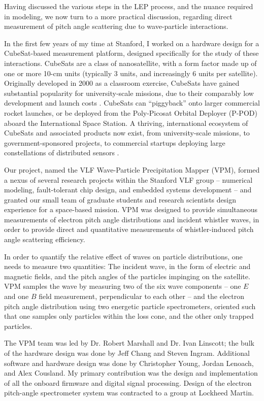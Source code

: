 Having discussed the various steps in the LEP process, and the nuance required in modeling, we now turn to a more practical discussion, regarding direct measurement of pitch angle scattering due to wave-particle interactions. 

In the first few years of my time at Stanford, I worked on a hardware design for a CubeSat-based measurement platform, designed specifically for the study of these interactions. CubeSats are a class of nanosatellite, with a form factor made up of one or more 10-cm units (typically 3 units, and increasingly 6 units per satellite). Originally developed in 2000 as a classroom exercise, CubeSats have gained substantial popularity for university-scale missions, due to their comparably low development and launch costs \citep{Heidt2000}. CubeSats can ``piggyback'' onto larger commercial rocket launches, or be deployed from the Poly-Picosat Orbital Deployer (P-POD) aboard the International Space Station. A thriving, international ecosystem of CubeSats and associated products now exist, from university-scale missions, to government-sponsored projects, to commercial startups deploying large constellations of distributed sensors \citep{Woellert2011, Swartwout2013}.

Our project, named the VLF Wave-Particle Precipitation Mapper (VPM), formed a nexus of several research projects within the Stanford VLF group -- numerical modeling, fault-tolerant chip design, and embedded systems development -- and granted our small team of graduate students and research scientists design experience for a space-based mission. VPM was designed to provide simultaneous measurements of electron pitch angle distributions and incident whistler waves, in order to provide direct and quantitative measurements of whistler-induced pitch angle scattering efficiency.

In order to quantify the relative effect of waves on particle distributions, one needs to measure two quantities: The incident wave, in the form of electric and magnetic fields, and the pitch angles of the particles impinging on the satellite. VPM samples the wave by measuring two of the six wave components -- one $E$ and one $B$ field measurement, perpendicular to each other -- and the electron pitch angle distribution using two energetic particle spectrometers, oriented such that one samples only particles within the loss cone, and the other only trapped particles.

The VPM team was led by Dr. Robert Marshall and Dr. Ivan Linscott; the bulk of the hardware design was done by Jeff Chang and Steven Ingram. Additional software and hardware design was done by Christopher Young, Jordan Lenoach, and Alex Cousland. My primary contribution was the design and implementation of all the onboard firmware and digital signal processing. Design of the electron pitch-angle spectrometer system was contracted to a group at Lockheed Martin.

